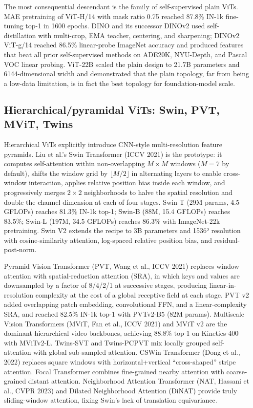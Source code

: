 \documentclass{article}
\begin{document}
The most consequential descendant is the family of self-supervised plain ViTs. MAE pretraining of ViT-H/14 with mask ratio 0.75 reached 87.8\% IN-1k fine-tuning top-1 in 1600 epochs. DINO and its successor DINOv2 used self-distillation with multi-crop, EMA teacher, centering, and sharpening; DINOv2 ViT-g/14 reached 86.5\% linear-probe ImageNet accuracy and produced features that beat all prior self-supervised methods on ADE20K, NYU-Depth, and Pascal VOC linear probing. ViT-22B scaled the plain design to 21.7B parameters and 6144-dimensional width and demonstrated that the plain topology, far from being a low-data limitation, is in fact the best topology for foundation-model scale.

\subsection{Hierarchical/pyramidal ViTs: Swin, PVT, MViT, Twins}\label{hierarchicalpyramidal-vits-swin-pvt-mvit-twins}

Hierarchical ViTs explicitly introduce CNN-style multi-resolution feature pyramids. Liu et al.'s Swin Transformer (ICCV 2021) is the prototype: it computes self-attention within non-overlapping \(M \times M\) windows (\(M=7\) by default), shifts the window grid by \(\lfloor M/2 \rfloor\) in alternating layers to enable cross-window interaction, applies relative position bias inside each window, and progressively merges \(2 \times 2\) neighborhoods to halve the spatial resolution and double the channel dimension at each of four stages. Swin-T (29M params, 4.5 GFLOPs) reaches 81.3\% IN-1k top-1; Swin-B (88M, 15.4 GFLOPs) reaches 83.5\%; Swin-L (197M, 34.5 GFLOPs) reaches 86.3\% with ImageNet-22k pretraining. Swin V2 \citep{liu2022aconvnetforthe2020} extends the recipe to 3B parameters and 1536² resolution with cosine-similarity attention, log-spaced relative position bias, and residual-post-norm.

Pyramid Vision Transformer (PVT, Wang et al., ICCV 2021) replaces window attention with spatial-reduction attention (SRA), in which keys and values are downsampled by a factor of 8/4/2/1 at successive stages, producing linear-in-resolution complexity at the cost of a global receptive field at each stage. PVT v2 \citep{wang2022pvtv2improvedbasel} added overlapping patch embedding, convolutional FFN, and a linear-complexity SRA, and reached 82.5\% IN-1k top-1 with PVTv2-B5 (82M params). Multiscale Vision Transformers (MViT, Fan et al., ICCV 2021) and MViT v2 are the dominant hierarchical video backbones, achieving 88.8\% top-1 on Kinetics-400 with MViTv2-L. Twins-SVT and Twins-PCPVT mix locally grouped self-attention with global sub-sampled attention. CSWin Transformer (Dong et al., 2022) replaces square windows with horizontal+vertical ``cross-shaped'' stripe attention. Focal Transformer combines fine-grained nearby attention with coarse-grained distant attention. Neighborhood Attention Transformer (NAT, Hassani et al., CVPR 2023) and Dilated Neighborhood Attention (DiNAT) provide truly sliding-window attention, fixing Swin's lack of translation equivariance.
\end{document}
